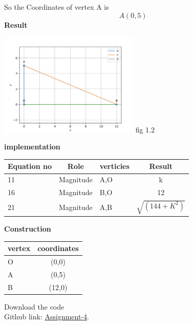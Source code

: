 \documentclass[10pt,a4paper]{report}
\begin{document}
\begin{multicols}{2}
So the Coordinates of vertex A is \\\vspace{2mm}
\begin{equation}
    A(0,5)
\end{equation}
\textbf{Result} 
\begin{center}
 \includegraphics[width=0.5\textwidth]{matrix.jpg}  
 fig 1.2   \vspace{2mm}\\
 \end{center}\vspace{5mm}
 \vspace{2mm}  
\textbf{implementation}
\begin{center}
\setlength{\arrayrulewidth}{0.5mm}
\setlength{\tabcolsep}{5pt}
\renewcommand{\arraystretch}{3}
    \begin{tabular}{|l|c|l|c|}
    \hline 
    \textbf{Equation no} & \textbf{Role} & \textbf{verticies} & \textbf{Result}\\ \hline
    11 & Magnitude & A,O & k \\ 
    16 & Magnitude & B,O & 12 \\
    21 & Magnitude & A,B & $\sqrt{(144+K^2)}$\\
    \hline
      \end{tabular}
  \end{center} \vspace{2mm}
  
 \vspace{2mm} \textbf{Construction}
\begin{center}
\setlength{\arrayrulewidth}{0.5mm}
\setlength{\tabcolsep}{5pt}
\renewcommand{\arraystretch}{3}
    \begin{tabular}{|l|c|}
    \hline 
    \textbf{vertex} & \textbf{coordinates} \\ \hline
    O & (0,0)  \\ 
    A & (0,5)  \\
    B & (12,0) \\
    \hline
      \end{tabular}
  \end{center}
  
\raggedright  Download the code \\
Github link: \href{https://github.com/chiragshah1244/FWC/blob/main/assignments/assignment_4/code/triangle.py}{Assignment-4}.

  \end{multicols}
\end{document}
